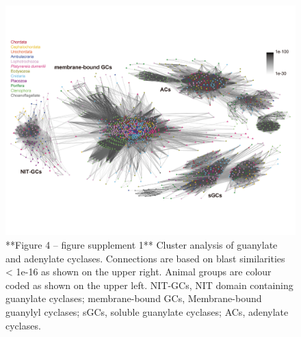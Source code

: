 \documentclass[
  10pt,
  onecolumn]{article}
\begin{document}
\begin{figure}
\includegraphics[width=33.33in]{figures/Fig4_sup1} \caption{**Figure 4 -- figure supplement 1** Cluster analysis of guanylate and adenylate cyclases. Connections are based on blast similarities < 1e-16 as shown on the upper right. Animal groups are colour coded as shown on the upper left. NIT-GCs, NIT domain containing guanylate cyclases; membrane-bound GCs, Membrane-bound guanylyl cyclases; sGCs, soluble guanylate cyclases; ACs, adenylate cyclases.}\label{fig:unnamed-chunk-12}
\end{figure}
\end{document}
